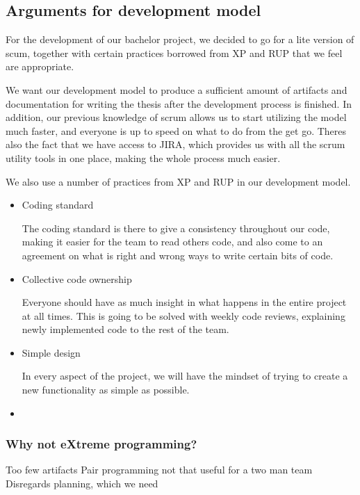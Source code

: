 \subsection{Arguments for development model}
For the development of our bachelor project, we decided to go for a lite version of scum, together with certain practices borrowed from XP and RUP that we feel are appropriate.


We want our development model to produce a sufficient amount of artifacts and documentation for writing the thesis after the development process is finished.
In addition, our previous knowledge of scrum allows us to start utilizing the model much faster, and everyone is up to speed on what to do from the get go.
Theres also the fact that we have access to JIRA, which provides us with all the scrum utility tools in one place, making the whole process much easier.


We also use a number of practices from XP and RUP in our development model. 
\begin{itemize}

    \item Coding standard


    The coding standard is there to give a consistency throughout our code, making it easier for the team to read others code, and also come to an agreement on what is right and wrong ways to write certain bits of code.


    \item Collective code ownership


    Everyone should have as much insight in what happens in the entire project at all times.
    This is going to be solved with weekly code reviews, explaining newly implemented code to the rest of the team.


    \item Simple design


    In every aspect of the project, we will have the mindset of trying to create a new functionality as simple as possible. 


    \item 

\end{itemize}

\subsubsection*{Why not eXtreme programming?}
Too few artifacts
Pair programming not that useful for a two man team
Disregards planning, which we need


